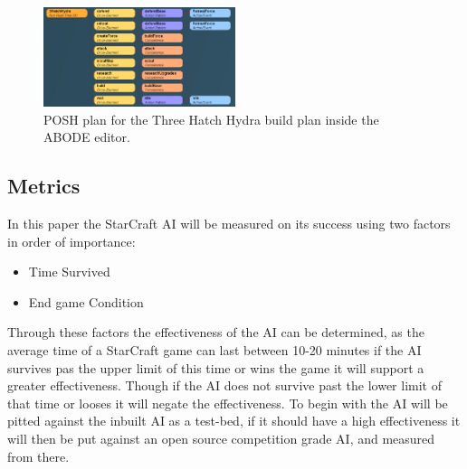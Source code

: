 \documentclass[journal]{IEEEtran}
\begin{document}
\begin{figure}[h]
	\centering
	\includegraphics[width=0.5\textwidth]{POSH}
	\caption{POSH plan for the Three Hatch Hydra build plan inside the ABODE editor.}
	\label{fig:mesh1}
\end{figure}
\newpage

\subsection{Metrics}
In this paper the StarCraft AI will be measured on its success using two factors in order of importance:
\begin{itemize}
	\item[] \centering Time Survived
	\item[] End game Condition
\end{itemize}

Through these factors the effectiveness of the AI can be determined, as the average time of a StarCraft game can last between 10-20 minutes if the AI survives pas the upper limit of this time or wins the game it will support a greater effectiveness. Though if the AI does not survive past the lower limit of that time or looses it will negate the effectiveness. To begin with the AI will be pitted against the inbuilt AI as a test-bed, if it should have a high effectiveness it will then be put against an open source competition grade AI, and measured from there.







\end{document}
